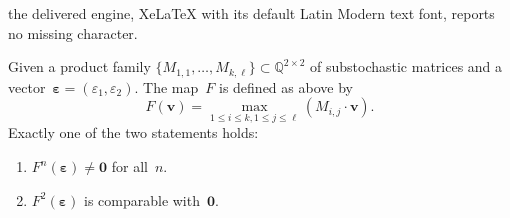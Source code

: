 \documentclass[10pt,a4paper]{amsart}
\newcommand{\QQ}{\mathbb{Q}}
\newcommand{\eps}{\bm{\varepsilon}}
\begin{document}
the delivered engine, XeLaTeX with its default Latin Modern text font, reports no missing character.
\begin{lemma}\label{2d-comp-soon}
	Given a product family $\{M_{1,1}, \dots, M_{k,\ell}\} \subset \QQ^{2\times 2}$ of substochastic matrices
	and a vector~$\eps = (\varepsilon_1, \varepsilon_2)$. 
	The map~$F$ is defined as above by
	\[F(\bm{v}) = \max_{1\leq i \leq k, 1\leq j \leq \ell} \left(M_{i,j} \cdot\bm{v}\right).\]
	Exactly one of the two statements holds:
	\begin{enumerate}
		\item $F^n(\eps) \neq \bm{0}$ for all~$n$.
		\item $F^2(\eps)$ is comparable with~$\bm{0}$.
	\end{enumerate}
\end{lemma}
\end{document}
